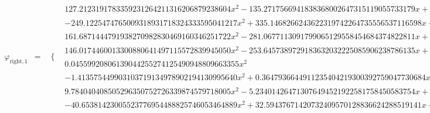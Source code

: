 \documentclass{article}
\begin{document}
\begin{landscape}
\begin{eqnarray*}
\begin{array}{cc}
\end{array}\\ 
\varphi_{\text{right},1} & = & \begin{array}{cc}
 \{ & 
\begin{array}{cc}
 127.2123191783359231264211316206879238604 x^2-135.2717566941838368002647315119055733179 x+35.55076143067004489641626386696141454076 & x\geq \frac{1}{2}\land x<\frac{5}{8} \\
 -249.1225474765009318931718324333595041217 x^2+335.1468266243622319742264735556537116598 x-111.4550458563756015956122377166508620148 & x\geq \frac{5}{8}\land x<\frac{3}{4} \\
 161.6871444791938270982830469160346251722 x^2-281.0677113091799065129558454684374822811 x+119.6254058687027003370811319173833357131 & x\geq \frac{3}{4}\land x<\frac{7}{8} \\
 146.0174460013300880641497115572839945050 x^2-253.6457389729183632032225085906238786135 x+107.6282929715882751390727970333398841085 & x\geq \frac{7}{8}\land x<1 \\
 0.04559920806139044255274125490948809663355 x^2 & x\geq 0\land x<\frac{1}{8} \\
 -1.413575449903103719134978902194130995640 x^2+0.3647936644911235404219300392759047730684 x-0.02279960403069522127637062745474404831678 & x\geq \frac{1}{8}\land x<\frac{1}{4} \\
 9.784040408505296350752726339874579718005 x^2-5.234014264713076494521922581758450583754 x+0.6770513871198297830916109501745503712860 & x\geq \frac{1}{4}\land x<\frac{3}{8} \\
 -40.65381423005523776954488825746053464889 x^2+32.59437671420732409570128836624288519141 x-6.415771921427745327575241102575700086558 & x\geq \frac{3}{8}\land x<\frac{1}{2}
\end{array}

\end{array}\end{eqnarray*}
\end{landscape}
\end{document}
